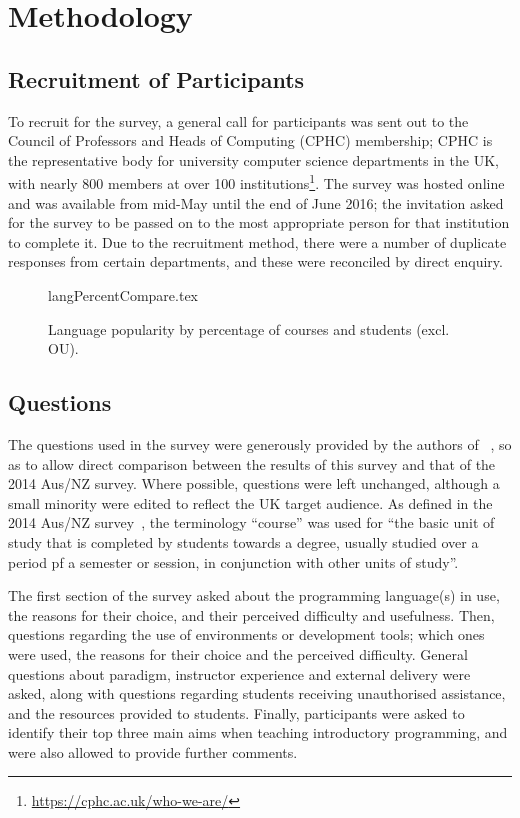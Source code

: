 \documentclass{sig-alternate}
\begin{document}
\section{Methodology}\label{method}

\subsection{Recruitment of Participants}

To recruit for the survey, a general call for participants was sent
out to the Council of Professors and Heads of Computing (CPHC)
membership; CPHC is the representative body for university computer
science departments in the UK, with nearly 800 members at over 100
institutions\footnote{\url{https://cphc.ac.uk/who-we-are/}}. The
survey was hosted online and was available from mid-May until the end
of June 2016; the invitation asked for the survey to be passed on to
the most appropriate person for that institution to complete it. Due
to the recruitment method, there were a number of duplicate responses
from certain departments, and these were reconciled by direct enquiry.

\begin{figure}
\begin{center}
{langPercentCompare.tex}
\end{center}\vskip-12pt
\caption{Language popularity by percentage of courses and students (excl. OU).\label{fig:lang}}
\end{figure}

\subsection{Questions}

The questions used in the survey were generously provided by the
authors of ~\cite{mason+cooper:2014}, so as to allow direct comparison
between the results of this survey and that of the 2014 Aus/NZ
survey. Where possible, questions were left unchanged, although a
small minority were edited to reflect the UK target audience. As
defined in the 2014 Aus/NZ survey~\cite{mason+cooper:2014}, the terminology
``course'' was used for ``the basic unit of study that is completed by
students towards a degree, usually studied over a period pf a semester
or session, in conjunction with other units of study''.

The first section of the survey asked about the programming
language(s) in use, the reasons for their choice, and their perceived
difficulty and usefulness. Then, questions regarding the use of
environments or development tools; which ones were used, the reasons
for their choice and the perceived difficulty. General questions about
paradigm, instructor experience and external delivery were asked,
along with questions regarding students receiving unauthorised
assistance, and the resources provided to students. Finally,
participants were asked to identify their top three main aims when
teaching introductory programming, and were also allowed to provide
further comments.
\end{document}
